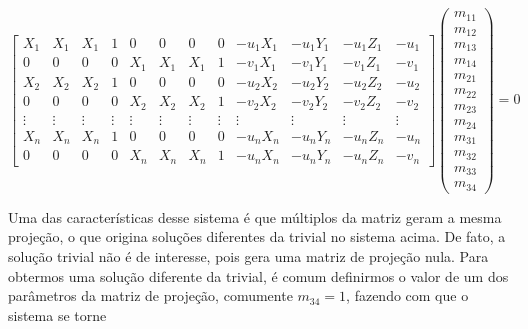 \documentclass[ecp,tc]{iiufrgs}
\begin{document}
\[
\begin{bmatrix}
X_1 & X_1 & X_1 & 1 & 0 & 0 & 0 & 0 & -u_1X_1 & -u_1Y_1 & -u_1Z_1 & -u_1 \\
0 & 0 & 0 & 0 & X_1 & X_1 & X_1 & 1 & -v_1X_1 & -v_1Y_1 & -v_1Z_1 & -v_1 \\
X_2 & X_2 & X_2 & 1 & 0 & 0 & 0 & 0 & -u_2X_2 & -u_2Y_2 & -u_2Z_2 & -u_2 \\
0 & 0 & 0 & 0 & X_2 & X_2 & X_2 & 1 & -v_2X_2 & -v_2Y_2 & -v_2Z_2 & -v_2 \\
\vdots & \vdots & \vdots & \vdots & \vdots & \vdots & \vdots & \vdots & \vdots & \vdots & \vdots & \vdots \\
X_n & X_n & X_n & 1 & 0 & 0 & 0 & 0 & -u_nX_n & -u_nY_n & -u_nZ_n & -u_n \\
0 & 0 & 0 & 0 & X_n & X_n & X_n & 1 & -u_nX_n & -u_nY_n & -u_nZ_n & -v_n 
\end{bmatrix}
\begin{pmatrix}m_{11} \\ m_{12} \\ m_{13} \\ m_{14} \\ m_{21} \\ m_{22} \\ m_{23} \\ m_{24} \\ m_{31} \\ m_{32} \\ m_{33} \\ m_{34} \end{pmatrix} = 0
\]

Uma das características desse sistema é que múltiplos da matriz geram a mesma projeção, o que origina soluções diferentes da trivial no sistema acima. De fato, a solução trivial não é de interesse, pois gera uma matriz de projeção nula. Para obtermos uma solução diferente da trivial, é comum definirmos o valor de um dos parâmetros da matriz de projeção, comumente $ m_{34} = 1 $, fazendo com que o sistema se torne
\end{document}
